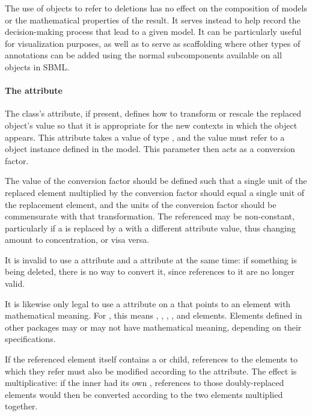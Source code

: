 The use of \ReplacedElement objects to refer to deletions has no effect on the composition of models or the mathematical properties of the result.  It serves instead to help record the decision-making process that lead to a given model.  It can be particularly useful for visualization purposes, as well as to serve as scaffolding where other types of annotations can be added using the normal \Annotation subcomponents available on all \SBase objects in SBML.




\paragraph{The \fixttspace{} attribute}
\label{replacedelement-conversionfactor}

The \ReplacedElement class's  attribute, if present, defines how to transform or rescale the replaced object's value so that it is appropriate for the new contexts in which the object appears.  This attribute takes a value of type , and the value must refer to a \Parameter object instance defined in the model.  This parameter then acts as a conversion factor.

The value of the conversion factor should be defined such that a single unit of the replaced element multiplied by the conversion factor should equal a single unit of the replacement element, and the units of the conversion factor should be commensurate with that transformation.  The referenced \Parameter may be non-constant, particularly if a \Species is replaced by a \Species with a different  attribute value, thus changing amount to concentration, or visa versa.

It is invalid to use a  attribute and a  attribute at the same time: if something is being deleted, there is no way to convert it, since references to it are no longer valid.

It is likewise only legal to use a  attribute on a \ReplacedElement that points to an element with mathematical meaning. For \sbmlthreecore, this means \Compartment, \Parameter, \Reaction, \Species, and \SpeciesReference elements.  Elements defined in other packages may or may not have mathematical meaning, depending on their specifications.

If the referenced element itself contains a \ReplacedElement or \ReplacedBy child, references to the elements to which they refer must also be modified according to the  attribute.  The effect is multiplicative: if the inner \ReplacedElement had its own , references to those doubly-replaced elements would then be converted according to the two  elements multiplied together.

